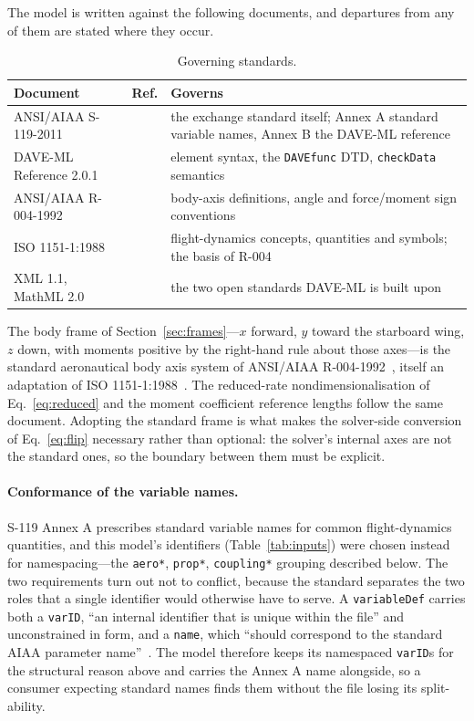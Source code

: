 \documentclass[11pt,a4paper]{article}
\newcommand{\varid}[1]{\texttt{\small #1}}
\begin{document}
The model is written against the following documents, and departures
from any of them are stated where they occur.

\begin{table}[htbp]
\centering
\caption{Governing standards.}
\label{tab:standards}
\begin{tabular}{@{}llp{62mm}@{}}
\toprule
\textbf{Document} & \textbf{Ref.} & \textbf{Governs} \\
\midrule
ANSI/AIAA S-119-2011 & \cite{s119} & the exchange standard itself;
Annex A standard variable names, Annex B the DAVE-ML reference \\
DAVE-ML Reference 2.0.1 & \cite{davemlref} & element syntax, the
\texttt{DAVEfunc} DTD, \texttt{checkData} semantics \\
ANSI/AIAA R-004-1992 & \cite{r004} & body-axis definitions, angle and
force/moment sign conventions \\
ISO 1151-1:1988 & \cite{iso1151} & flight-dynamics concepts, quantities
and symbols; the basis of R-004 \\
XML 1.1, MathML 2.0 & \cite{xml,mathml} & the two open standards
DAVE-ML is built upon \\
\bottomrule
\end{tabular}
\end{table}

The body frame of Section~\ref{sec:frames}---$x$ forward, $y$ toward the
starboard wing, $z$ down, with moments positive by the right-hand rule
about those axes---is the standard aeronautical body axis system of
ANSI/AIAA R-004-1992~\cite{r004}, itself an adaptation of ISO
1151-1:1988~\cite{iso1151}. The reduced-rate nondimensionalisation of
Eq.~\eqref{eq:reduced} and the moment coefficient reference lengths
follow the same document. Adopting the standard frame is what makes the
solver-side conversion of Eq.~\eqref{eq:flip} necessary rather than
optional: the solver's internal axes are not the standard ones, so the
boundary between them must be explicit.

\paragraph{Conformance of the variable names.} S-119 Annex A prescribes
standard variable names for common flight-dynamics quantities, and this
model's identifiers (Table~\ref{tab:inputs}) were chosen instead for
namespacing---the \varid{aero*}, \varid{prop*}, \varid{coupling*}
grouping described below. The two requirements turn out not to conflict,
because the standard separates the two roles that a single identifier
would otherwise have to serve. A \texttt{variableDef} carries both a
\texttt{varID}, ``an internal identifier that is unique within the
file'' and unconstrained in form, and a \texttt{name}, which ``should
correspond to the standard AIAA parameter name''~\cite{davemlref}. The
model therefore keeps its namespaced \texttt{varID}s for the structural
reason above and carries the Annex A name alongside, so a consumer
expecting standard names finds them without the file losing its
split-ability.
\end{document}
